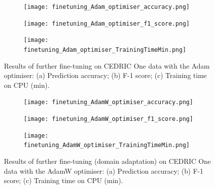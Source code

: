 \documentclass[a4paper,12pt]{article}
\newcommand{\figwidtht}{0.32\textwidth}
\newcommand{\figwidthhh}{0.45\textwidth}
\newcommand{\inghamOne}{CEDRIC One\xspace}   %
\begin{document}
	
\begin{figure}[h!]
	\begin{center}
		\begin{subfigure}[b]{\figwidthhh}
			\caption{} 
			\texttt{[image: finetuning\_Adam\_optimiser\_accuracy.png]}
		\end{subfigure}
        \hfill
		\begin{subfigure}[b]{\figwidthhh}
			\caption{}
			\texttt{[image: finetuning\_Adam\_optimiser\_f1\_score.png]}
		\end{subfigure}
        \hfill
		\begin{subfigure}[b]{\figwidthhh}
			\caption{}
			\texttt{[image: finetuning\_Adam\_optimiser\_TrainingTimeMin.png]}
		\end{subfigure}
	\end{center}                                                                
	\caption{Results of further fine-tuning on \inghamOne data with the Adam optimiser: (a) Prediction accuracy; (b) F-1 score; (c) Training time on CPU (min).
	} 
\end{figure}



\begin{figure}[tb]
	\begin{center}
		\begin{subfigure}[b]{\figwidtht}
			\caption{} 
			\texttt{[image: finetuning\_AdamW\_optimiser\_accuracy.png]}
		\end{subfigure}
        \hfill
		\begin{subfigure}[b]{\figwidtht}
			\caption{}
			\texttt{[image: finetuning\_AdamW\_optimiser\_f1\_score.png]}
		\end{subfigure}
        \hfill
		\begin{subfigure}[b]{\figwidtht}
			\caption{}
			\texttt{[image: finetuning\_AdamW\_optimiser\_TrainingTimeMin.png]}
		\end{subfigure}
	\end{center}
	\caption{Results of further fine-tuning (domain adaptation) on \inghamOne data with the AdamW optimiser: (a) Prediction accuracy; (b) F-1 score; (c) Training time on CPU (min).
	} 
	\label{fig:res_domainAdaptation}
\end{figure}
\end{document}
